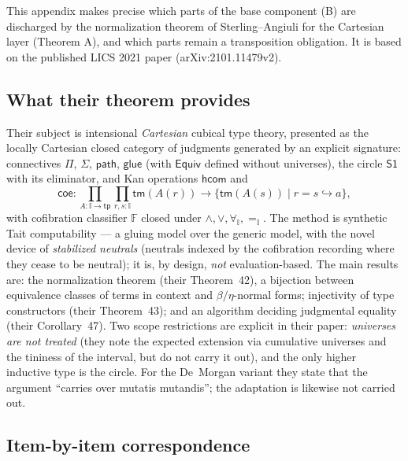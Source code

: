 \documentclass{lmcs}
\newcommand{\I}{\mathbb{I}}
\begin{document}
This appendix makes precise which parts of the base component (B) are
discharged by the normalization theorem of Sterling--Angiuli
\cite{SterlingAngiuli} for the Cartesian layer (Theorem A), and which
parts remain a transposition obligation.  It is based on the
published LICS 2021 paper (arXiv:2101.11479v2).

\subsection{What their theorem provides}

Their subject is intensional \emph{Cartesian} cubical type theory,
presented as the locally Cartesian closed category of judgments
generated by an explicit signature: connectives $\Pi$, $\Sigma$,
$\mathsf{path}$, $\mathsf{glue}$ (with $\mathsf{Equiv}$ defined
without universes), the circle $\mathsf{S1}$ with its eliminator, and
Kan operations $\mathsf{hcom}$ and
\[
  \mathsf{coe} : \textstyle\prod_{A : \I \to \mathsf{tp}}
  \prod_{r, s : \I} \mathsf{tm}(A(r)) \to
  \{\mathsf{tm}(A(s)) \mid r = s \hookrightarrow a\},
\]
with cofibration classifier $\mathbb{F}$ closed under
$\wedge, \vee, \forall_\I, =_\I$.  The method is synthetic Tait
computability --- a gluing model over the generic model, with the
novel device of \emph{stabilized neutrals} (neutrals indexed by the
cofibration recording where they cease to be neutral); it is, by
design, \emph{not} evaluation-based.  The main results are: the
normalization theorem (their Theorem~42), a bijection between
equivalence classes of terms in context and $\beta/\eta$-normal
forms; injectivity of type constructors (their Theorem~43); and an
algorithm deciding judgmental equality (their Corollary~47).  Two
scope restrictions are explicit in their paper: \emph{universes are
not treated} (they note the expected extension via cumulative
universes and the tininess of the interval, but do not carry it
out), and the only higher inductive type is the circle.  For the
De~Morgan variant they state that the argument ``carries over
mutatis mutandis''; the adaptation is likewise not carried out.

\subsection{Item-by-item correspondence}
\end{document}
